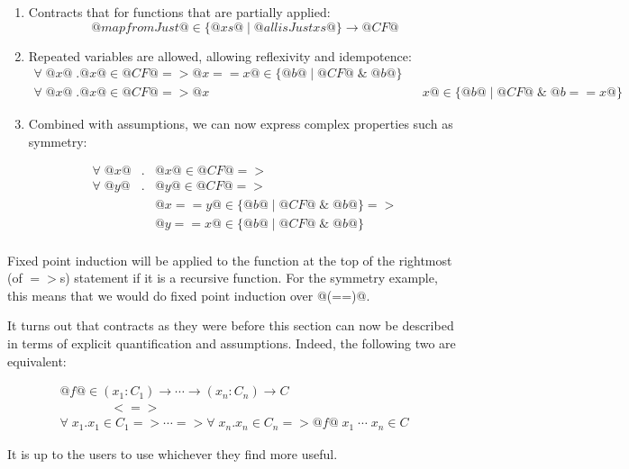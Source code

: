 \begin{enumerate}
  \item Contracts that for functions that are partially applied:
    $$@map fromJust@ \in \{ @xs@ \mid @all isJust xs@ \} \to @CF@$$

  \item Repeated variables are allowed, allowing reflexivity and
    idempotence:
    \[\begin{array}{l}
    \forall \; @x@ \; . @x@ \in @CF@ => @x == x@ \in \{ @b@ \mid @CF@ \; \& \; @b@ \} \\
    \forall \; @x@ \; . @x@ \in @CF@ => @x && x@ \in \{ @b@ \mid @CF@ \; \& \; @b == x@ \}
    \end{array}\]

  \item Combined with assumptions, we can now express complex
      properties such as symmetry:

    \[\begin{array}{rcl}
    \forall \; @x@ & . & @x@ \in @CF@ => \\
    \forall \; @y@ & . & @y@ \in @CF@ => \\
                   &   & @x == y@ \in \{ @b@ \mid @CF@ \; \& \; @b@ \} => \\
                   &   & @y == x@ \in \{ @b@ \mid @CF@ \; \& \; @b@ \}    \\
    \end{array}\]

\end{enumerate}

Fixed point induction will be applied to the function at the top of
the rightmost (of $=>$s) statement if it is a recursive function. For
the symmetry example, this means that we would do fixed point induction
over @(==)@.

It turns out that contracts as they were before this section can now
be described in terms of explicit quantification and
assumptions. Indeed, the following two are equivalent:

\[\begin{array}{l}
@f@ \in (x_1 : C_1) \to \cdots \to (x_n : C_n) \to C
\\ \qquad\qquad <=> \\
\forall \; x_1 . x_1 \in C_1 => \cdots =>
\forall \; x_n . x_n \in C_n =>
    @f@ \; x_1 \; \cdots \; x_n \in C
\end{array}\]

It is up to the users to use whichever they find more useful.

